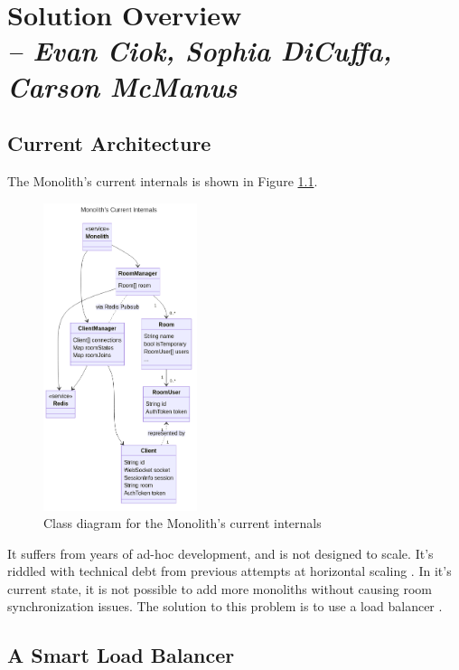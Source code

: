 \chapter{Solution Overview \\
  \small{\textit{-- Evan Ciok, Sophia DiCuffa, Carson McManus}}
  \label{Chapter::SolutionOverview}}

\section{Current Architecture}

The Monolith's  current internals is shown in Figure \ref{Figure::monolith-class-current}.

\begin{figure}[!h]
  \centering
  \includegraphics[width=0.4\textwidth]{Figures/monolith-class-current.png}
  \caption{Class diagram for the Monolith's current internals}
  \label{Figure::monolith-class-current}
\end{figure}

It suffers from years of ad-hoc development, and is not designed to scale. It's riddled with technical debt from previous attempts at horizontal scaling . In it's current state, it is not possible to add more monoliths without causing room synchronization issues. The solution to this problem is to use a load balancer .

\section{A Smart Load Balancer}


